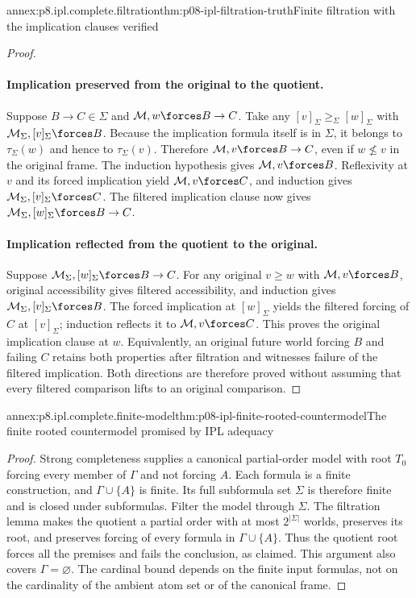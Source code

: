 \begin{annexitem}{annex:p8.ipl.complete.filtration}{thm:p08-ipl-filtration-truth}{Finite filtration with the implication clauses verified}
\begin{proof}
\paragraph{Implication preserved from the original to the quotient.}
Suppose \(B\to C\in\Sigma\) and \(\mathcal M,w\forces B\to C\).
Take any \([v]_\Sigma\geq_\Sigma[w]_\Sigma\) with
\(\mathcal M_\Sigma,[v]_\Sigma\forces B\). Because the implication
formula itself is in \(\Sigma\), it belongs to
\(\tau_\Sigma(w)\) and hence to \(\tau_\Sigma(v)\). Therefore
\(\mathcal M,v\forces B\to C\), even if \(w\not\leq v\)
in the original frame. The induction hypothesis gives
\(\mathcal M,v\forces B\). Reflexivity at \(v\) and its forced
implication yield \(\mathcal M,v\forces C\), and induction gives
\(\mathcal M_\Sigma,[v]_\Sigma\forces C\). The filtered
implication clause now gives
\(\mathcal M_\Sigma,[w]_\Sigma\forces B\to C\).

\paragraph{Implication reflected from the quotient to the original.}
Suppose \(\mathcal M_\Sigma,[w]_\Sigma\forces B\to C\).
For any original \(v\geq w\) with \(\mathcal M,v\forces B\),
original accessibility gives filtered accessibility, and induction gives
\(\mathcal M_\Sigma,[v]_\Sigma\forces B\). The forced implication
at \([w]_\Sigma\) yields the filtered forcing of \(C\) at
\([v]_\Sigma\); induction reflects it to
\(\mathcal M,v\forces C\). This proves the original implication
clause at \(w\). Equivalently, an original future world forcing
\(B\) and failing \(C\) retains both properties after filtration
and witnesses failure of the filtered implication. Both directions are
therefore proved without assuming that every filtered comparison lifts
to an original comparison.
\end{proof}
\end{annexitem}

\begin{annexitem}{annex:p8.ipl.complete.finite-model}{thm:p08-ipl-finite-rooted-countermodel}{The finite rooted countermodel promised by IPL adequacy}
\begin{proof}
Strong completeness supplies a canonical partial-order model with root
\(T_0\) forcing every member of \(\Gamma\) and not forcing \(A\).
Each formula is a finite construction, and \(\Gamma\cup\{A\}\)
is finite. Its full subformula set \(\Sigma\) is therefore finite
and is closed under subformulas. Filter the model through \(\Sigma\).
The filtration lemma makes the quotient a partial order with at most
\(2^{|\Sigma|}\) worlds, preserves its root, and preserves forcing
of every formula in \(\Gamma\cup\{A\}\). Thus the quotient root
forces all the premises and fails the conclusion, as claimed. This
argument also covers \(\Gamma=\varnothing\). The cardinal bound
depends on the finite input formulas, not on the cardinality of the
ambient atom set or of the canonical frame.
\end{proof}
\end{annexitem}

